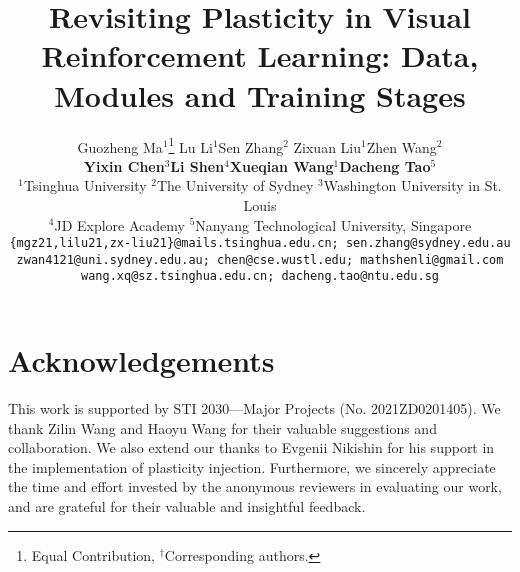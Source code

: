 \documentclass{article} %
\title{Revisiting Plasticity in Visual Reinforcement Learning: Data, Modules and Training Stages}
\author{Guozheng Ma$^{1}$\thanks{Equal Contribution, $^{\dag}$Corresponding authors.} \quad Lu Li$^{1}$\footnotemark[1] \quad Sen Zhang$^2$ \quad Zixuan Liu$^1$\quad Zhen Wang$^2$ \\ \textbf{Yixin Chen$^3$\quad Li Shen$^4$\footnotemark[2]\quad Xueqian Wang$^{1}$\footnotemark[2] \quad Dacheng Tao$^5$} 
\\
{\fontsize{8.5}{9}\selectfont $^1$Tsinghua University \quad $^2$The University of Sydney \quad $^3$Washington University in St. Louis} \\ {\fontsize{8.5}{9}\selectfont $^4$JD Explore Academy \quad $^5$Nanyang Technological University, Singapore}  \\
{\tt\fontsize{7.8}{7.8}\selectfont \{mgz21,lilu21,zx-liu21\}@mails.tsinghua.edu.cn; sen.zhang@sydney.edu.au} \\
{\tt\fontsize{7.8}{7.8}\selectfont zwan4121@uni.sydney.edu.au; chen@cse.wustl.edu; mathshenli@gmail.com}\\
{\tt\fontsize{7.8}{7.8}\selectfont wang.xq@sz.tsinghua.edu.cn; dacheng.tao@ntu.edu.sg}
}
\begin{document}
\maketitle

\begin{abstract}

\end{abstract}









\newpage
\appendix


\newpage
\section*{Acknowledgements}
This work is supported by STI 2030—Major Projects (No. 2021ZD0201405). 
We thank Zilin Wang and Haoyu Wang for their valuable suggestions and collaboration. We also extend our thanks to Evgenii Nikishin for his support in the implementation of plasticity injection.
Furthermore, we sincerely appreciate the time and effort invested by the anonymous reviewers in evaluating our work, and are grateful for their valuable and insightful feedback.

\newpage


\end{document}
